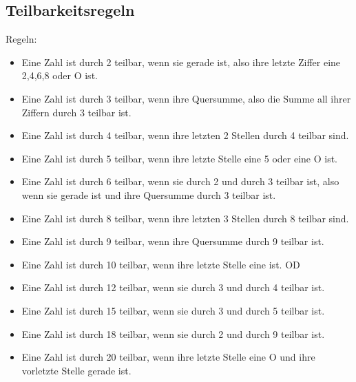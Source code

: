 \newpage
\subsection{Teilbarkeitsregeln}

Regeln:
\begin{itemize}
    \item Eine Zahl ist durch 2 teilbar, wenn sie gerade ist, also ihre letzte Ziffer eine 2,4,6,8 oder O ist.
    \item Eine Zahl ist durch 3 teilbar, wenn ihre Quersumme, also die Summe all ihrer Ziffern durch 3 teilbar ist.
    \item Eine Zahl ist durch 4 teilbar, wenn ihre letzten 2 Stellen durch 4 teilbar sind.
    \item Eine Zahl ist durch 5 teilbar, wenn ihre letzte Stelle eine 5 oder eine O ist.
    \item Eine Zahl ist durch 6 teilbar, wenn sie durch 2 und durch 3 teilbar ist, also wenn sie gerade ist und ihre Quersumme durch 3 teilbar ist.
    \item Eine Zahl ist durch 8 teilbar, wenn ihre letzten 3 Stellen durch 8 teilbar sind.
    \item Eine Zahl ist durch 9 teilbar, wenn ihre Quersumme durch 9 teilbar ist.
    \item Eine Zahl ist durch 10 teilbar, wenn ihre letzte Stelle eine ist. OD
    \item Eine Zahl ist durch 12 teilbar, wenn sie durch 3 und durch 4 teilbar ist.
    \item Eine Zahl ist durch 15 teilbar, wenn sie durch 3 und durch 5 teilbar ist.
    \item Eine Zahl ist durch 18 teilbar, wenn sie durch 2 und durch 9 teilbar ist.
    \item Eine Zahl ist durch 20 teilbar, wenn ihre letzte Stelle eine O und ihre vorletzte Stelle gerade ist.
\end{itemize}